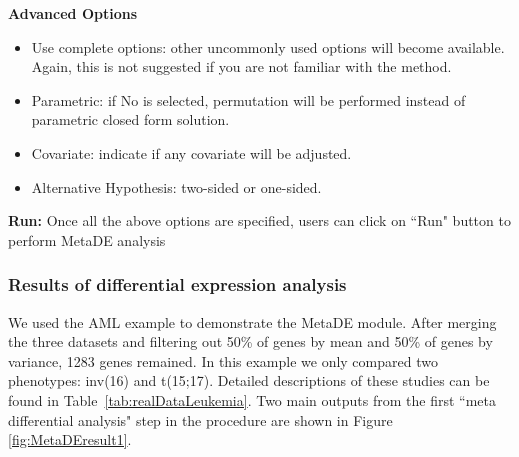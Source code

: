 \begin{steps}
\item \textbf{Advanced Options}
\begin{itemize}
\item Use complete options: other uncommonly used options will become available. Again, this is not suggested if you are not familiar with the method.
\item Parametric: if No is selected, permutation will be performed instead of parametric closed form solution.
\item Covariate: indicate if any covariate will be adjusted.
\item Alternative Hypothesis: two-sided or one-sided.
\end{itemize}

\item \textbf{Run:}
Once all the above options are specified, users can click on ``Run" button to perform MetaDE analysis

\end{steps}

\subsubsection{Results of differential expression analysis}

We used the AML example to demonstrate the MetaDE module.
After merging the three datasets and filtering out 50\% of genes by mean and 50\% of genes by variance, 1283 genes remained.
In this example we only compared two phenotypes: inv(16) and t(15;17).
Detailed descriptions of these studies can be found in Table~\ref{tab:realDataLeukemia}. 
Two main outputs from the first ``meta differential analysis" step in the procedure are shown in Figure \ref{fig:MetaDEresult1}. 


